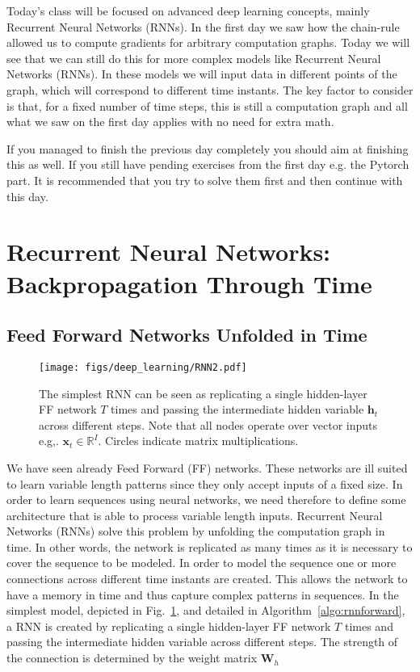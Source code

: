 Today's class will be focused on advanced deep learning concepts, mainly
Recurrent Neural Networks (RNNs). In the first day we saw how the chain-rule
allowed us to compute gradients for arbitrary computation graphs. Today we will
see that we can still do this for more complex models like Recurrent Neural
Networks (RNNs). In these models we will input data in different points of the
graph, which will correspond to different time instants. The key factor to
consider is that, for a fixed number of time steps, this is still a computation
graph and all what we saw on the first day applies with no need for extra math.

If you managed to finish the previous day completely you should aim at finishing
this as well. If you still have pending exercises from the first day e.g. the
Pytorch part. It is recommended that you try to solve them first and then
continue with this day. 

\section{Recurrent Neural Networks: Backpropagation Through Time}

\subsection{Feed Forward Networks Unfolded in Time}

\begin{figure}[!h]
\centering
\texttt{[image: figs/deep\_learning/RNN2.pdf]}
\caption{The simplest RNN can be seen as replicating a single hidden-layer FF
network $T$ times and passing the intermediate hidden variable $\mathbf{h}_t$
across different steps. Note that all nodes operate over vector inputs e.g,.
$\mathbf{x}_t \in \mathbb{R}^I$. Circles indicate matrix multiplications.}
\label{fig:RNN}
\end{figure}

We have seen already Feed Forward (FF) networks. These networks are ill
suited to learn variable length patterns since they only accept inputs of a
fixed size. In order to learn sequences using neural networks, we need therefore
to define some architecture that is able to process variable length inputs.
Recurrent Neural Networks (RNNs) solve this problem by unfolding the
computation graph in time. In other words, the network is replicated as many
times as it is necessary to cover the sequence to be modeled. In order
to model the sequence one or more connections across different time instants are
created. This allows the network to have a memory in time and thus capture
complex patterns in sequences. In the simplest model, depicted in
Fig.~\ref{fig:RNN}, and detailed in Algorithm~\ref{algo:rnnforward}, a RNN is
created by replicating a single hidden-layer FF network $T$ times and passing
the intermediate hidden variable across different steps. The strength of the
connection is determined by the weight matrix $\mathbf{W}_h$

